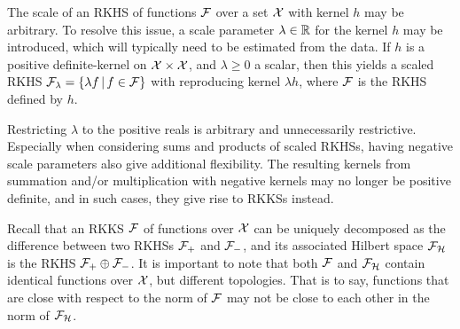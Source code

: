 The scale of an RKHS of functions ${\mathcal F}$ over a set ${\mathcal X}$ with kernel $h$ may be arbitrary.
To resolve this issue, a scale parameter $\lambda\in\mathbb{R}$ for the kernel $h$ may be introduced, which will typically need to be estimated from the data. 
If $h$ is a positive definite-kernel on ${\mathcal X}\times{\mathcal X}$, and $\lambda \geq 0$ a scalar, then this yields a scaled RKHS ${\mathcal F}_\lambda = \{\lambda f \,|\, f \in {\mathcal F} \}$ with reproducing kernel $\lambda h$, where ${\mathcal F}$ is the RKHS defined by $h$.

Restricting $\lambda$ to the positive reals is arbitrary and unnecessarily restrictive.
Especially when considering sums and products of scaled RKHSs, having negative scale parameters also give additional flexibility.
The resulting kernels from summation and/or multiplication with negative kernels may no longer be positive definite, and in such cases, they give rise to RKKSs instead.

\begin{remark}
  Recall that an RKKS ${\mathcal F}$ of functions over ${\mathcal X}$ can be uniquely decomposed as the difference between two RKHSs ${\mathcal F}_+$ and ${\mathcal F}_-$, and its associated Hilbert space ${\mathcal F}_{\mathcal H}$ is the RKHS ${\mathcal F}_+ \oplus {\mathcal F}_-$.
  It is important to note that both ${\mathcal F}$ and ${\mathcal F}_{\mathcal H}$ contain identical functions over ${\mathcal X}$, but different topologies.
  That is to say, functions that are close with respect to the norm of ${\mathcal F}$ may not be close to each other in the norm of ${\mathcal F}_{\mathcal H}$.
\end{remark}

